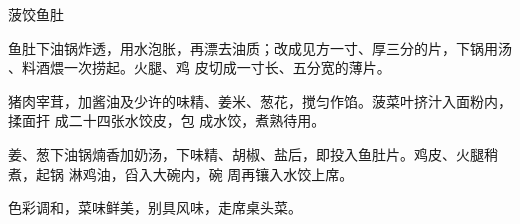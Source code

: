 \begin{recipe}{菠饺鱼肚}

\ingredients


\preparation

\step 鱼肚下油锅炸透，用水泡胀，再漂去油质；改成见方一寸、厚三分的片，下锅用汤
、料酒煨一次捞起。火腿、鸡 皮切成一寸长、五分宽的薄片。

猪肉宰茸，加酱油及少许的味精、姜米、葱花，搅匀作馅。菠菜叶挤汁入面粉内，揉面扞
成二十四张水饺皮，包 成水饺，煮熟待用。

姜、葱下油锅煵香加奶汤，下味精、胡椒、盐后，即投入鱼肚片。鸡皮、火腿稍煮，起锅
淋鸡油，舀入大碗内，碗 周再镶入水饺上席。

\features

色彩调和，菜味鲜美，别具风味，走席桌头菜。

\end{recipe}

